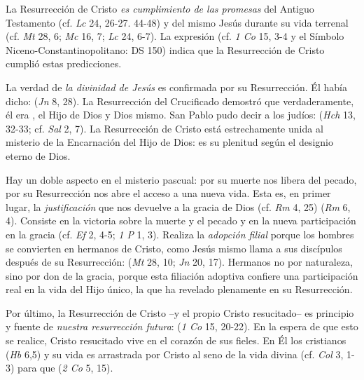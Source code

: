 \begin{ccebody}
 La Resurrección de Cristo \textit{es cumplimiento de las promesas} del Antiguo Testamento (cf. \textit{Lc} 24, 26-27. 44-48) y del mismo Jesús durante su vida terrenal (cf. \textit{Mt} 28, 6; \textit{Mc} 16, 7; \textit{Lc} 24, 6-7). La expresión  (cf. \textit{1 Co} 15, 3-4 y el Símbolo Niceno-Constantinopolitano: DS 150) indica que la Resurrección de Cristo cumplió estas predicciones.

 La verdad de \textit{la divinidad de Jesús} es confirmada por su Resurrección. Él había dicho:  (\textit{Jn} 8, 28). La Resurrección del Crucificado demostró que verdaderamente, él era , el Hijo de Dios y Dios mismo. San Pablo pudo decir a los judíos:  (\textit{Hch} 13, 32-33; cf. \textit{Sal} 2, 7). La Resurrección de Cristo está estrechamente unida al misterio de la Encarnación del Hijo de Dios: es su plenitud según el designio eterno de Dios.

 Hay un doble aspecto en el misterio pascual: por su muerte nos libera del pecado, por su Resurrección nos abre el acceso a una nueva vida. Esta es, en primer lugar, la \textit{justificación} que nos devuelve a la gracia de Dios (cf. \textit{Rm} 4, 25)  (\textit{Rm} 6, 4). Consiste en la victoria sobre la muerte y el pecado y en la nueva participación en la gracia (cf. \textit{Ef} 2, 4-5; \textit{1 P} 1, 3). Realiza la \textit{adopción filial} porque los hombres se convierten en hermanos de Cristo, como Jesús mismo llama a sus discípulos después de su Resurrección:  (\textit{Mt} 28, 10; \textit{Jn} 20, 17). Hermanos no por naturaleza, sino por don de la gracia, porque esta filiación adoptiva confiere una participación real en la vida del Hijo único, la que ha revelado plenamente en su Resurrección.

 Por último, la Resurrección de Cristo –y el propio Cristo resucitado– es principio y fuente de \textit{nuestra resurrección futura}:  (\textit{1 Co} 15, 20-22). En la espera de que esto se realice, Cristo resucitado vive en el corazón de sus fieles. En Él los cristianos  (\textit{Hb} 6,5) y su vida es arrastrada por Cristo al seno de la vida divina (cf. \textit{Col} 3, 1-3) para que  (\textit{2 Co} 5, 15).


\end{ccebody}
